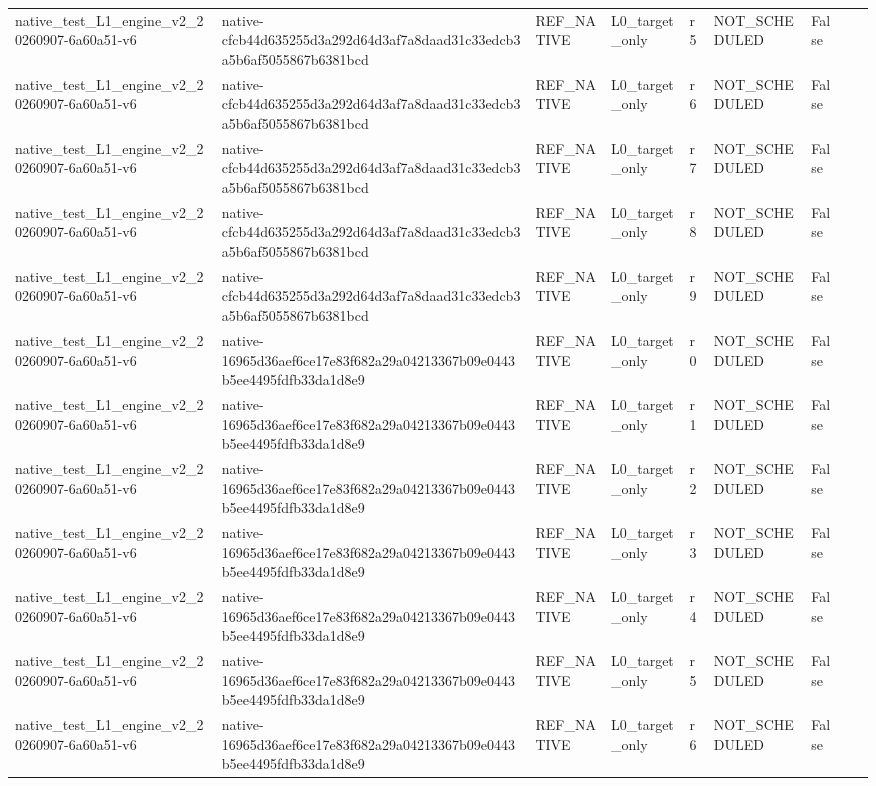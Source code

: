 \begin{tabular}{lllllllll}
native\_test\_L1\_engine\_v2\_20260907-6a60a51-v6 & native-cfcb44d635255d3a292d64d3af7a8daad31c33edcb3a5b6af5055867b6381bcd & REF\_NATIVE & L0\_target\_only & r5 & NOT\_SCHEDULED & False &  &  \\
native\_test\_L1\_engine\_v2\_20260907-6a60a51-v6 & native-cfcb44d635255d3a292d64d3af7a8daad31c33edcb3a5b6af5055867b6381bcd & REF\_NATIVE & L0\_target\_only & r6 & NOT\_SCHEDULED & False &  &  \\
native\_test\_L1\_engine\_v2\_20260907-6a60a51-v6 & native-cfcb44d635255d3a292d64d3af7a8daad31c33edcb3a5b6af5055867b6381bcd & REF\_NATIVE & L0\_target\_only & r7 & NOT\_SCHEDULED & False &  &  \\
native\_test\_L1\_engine\_v2\_20260907-6a60a51-v6 & native-cfcb44d635255d3a292d64d3af7a8daad31c33edcb3a5b6af5055867b6381bcd & REF\_NATIVE & L0\_target\_only & r8 & NOT\_SCHEDULED & False &  &  \\
native\_test\_L1\_engine\_v2\_20260907-6a60a51-v6 & native-cfcb44d635255d3a292d64d3af7a8daad31c33edcb3a5b6af5055867b6381bcd & REF\_NATIVE & L0\_target\_only & r9 & NOT\_SCHEDULED & False &  &  \\
native\_test\_L1\_engine\_v2\_20260907-6a60a51-v6 & native-16965d36aef6ce17e83f682a29a04213367b09e0443b5ee4495fdfb33da1d8e9 & REF\_NATIVE & L0\_target\_only & r0 & NOT\_SCHEDULED & False &  &  \\
native\_test\_L1\_engine\_v2\_20260907-6a60a51-v6 & native-16965d36aef6ce17e83f682a29a04213367b09e0443b5ee4495fdfb33da1d8e9 & REF\_NATIVE & L0\_target\_only & r1 & NOT\_SCHEDULED & False &  &  \\
native\_test\_L1\_engine\_v2\_20260907-6a60a51-v6 & native-16965d36aef6ce17e83f682a29a04213367b09e0443b5ee4495fdfb33da1d8e9 & REF\_NATIVE & L0\_target\_only & r2 & NOT\_SCHEDULED & False &  &  \\
native\_test\_L1\_engine\_v2\_20260907-6a60a51-v6 & native-16965d36aef6ce17e83f682a29a04213367b09e0443b5ee4495fdfb33da1d8e9 & REF\_NATIVE & L0\_target\_only & r3 & NOT\_SCHEDULED & False &  &  \\
native\_test\_L1\_engine\_v2\_20260907-6a60a51-v6 & native-16965d36aef6ce17e83f682a29a04213367b09e0443b5ee4495fdfb33da1d8e9 & REF\_NATIVE & L0\_target\_only & r4 & NOT\_SCHEDULED & False &  &  \\
native\_test\_L1\_engine\_v2\_20260907-6a60a51-v6 & native-16965d36aef6ce17e83f682a29a04213367b09e0443b5ee4495fdfb33da1d8e9 & REF\_NATIVE & L0\_target\_only & r5 & NOT\_SCHEDULED & False &  &  \\
native\_test\_L1\_engine\_v2\_20260907-6a60a51-v6 & native-16965d36aef6ce17e83f682a29a04213367b09e0443b5ee4495fdfb33da1d8e9 & REF\_NATIVE & L0\_target\_only & r6 & NOT\_SCHEDULED & False &  &  \\

\end{tabular}
